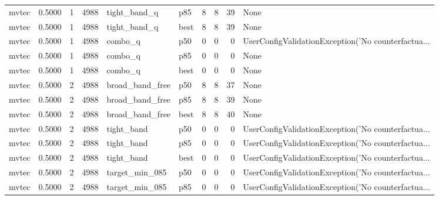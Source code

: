 \begin{tabular}{lrrrllrrrl}
   mvtec &    0.5000 &    1 &   4988 &         tight\_band\_q &    p85 &               8 &          8 &      39 &                                               None \\
   mvtec &    0.5000 &    1 &   4988 &         tight\_band\_q &   best &               8 &          8 &      39 &                                               None \\
   mvtec &    0.5000 &    1 &   4988 &              combo\_q &    p50 &               0 &          0 &       0 & UserConfigValidationException('No counterfactua... \\
   mvtec &    0.5000 &    1 &   4988 &              combo\_q &    p85 &               0 &          0 &       0 &                                               None \\
   mvtec &    0.5000 &    1 &   4988 &              combo\_q &   best &               0 &          0 &       0 &                                               None \\
   mvtec &    0.5000 &    2 &   4988 &      broad\_band\_free &    p50 &               8 &          8 &      37 &                                               None \\
   mvtec &    0.5000 &    2 &   4988 &      broad\_band\_free &    p85 &               8 &          8 &      39 &                                               None \\
   mvtec &    0.5000 &    2 &   4988 &      broad\_band\_free &   best &               8 &          8 &      40 &                                               None \\
   mvtec &    0.5000 &    2 &   4988 &           tight\_band &    p50 &               0 &          0 &       0 & UserConfigValidationException('No counterfactua... \\
   mvtec &    0.5000 &    2 &   4988 &           tight\_band &    p85 &               0 &          0 &       0 & UserConfigValidationException('No counterfactua... \\
   mvtec &    0.5000 &    2 &   4988 &           tight\_band &   best &               0 &          0 &       0 & UserConfigValidationException('No counterfactua... \\
   mvtec &    0.5000 &    2 &   4988 &       target\_min\_085 &    p50 &               0 &          0 &       0 & UserConfigValidationException('No counterfactua... \\
   mvtec &    0.5000 &    2 &   4988 &       target\_min\_085 &    p85 &               0 &          0 &       0 & UserConfigValidationException('No counterfactua... \\

\end{tabular}
